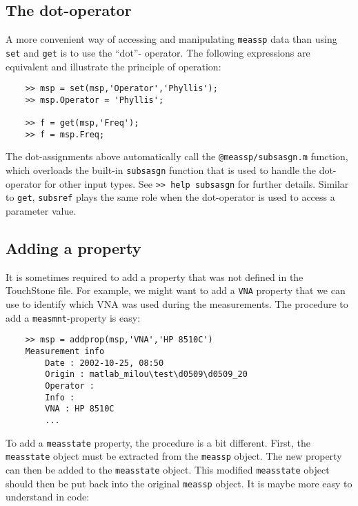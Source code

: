 \subsection{The dot-operator}
A more convenient way of accessing and manipulating \verb"meassp"
data than using \verb"set" and \verb"get" is to use the ``dot''-
operator. The following expressions are equivalent and illustrate
the principle of operation:

\begin{small}
\begin{verbatim}
    >> msp = set(msp,'Operator','Phyllis');
    >> msp.Operator = 'Phyllis';

    >> f = get(msp,'Freq');
    >> f = msp.Freq;
\end{verbatim}
\end{small}

The dot-assignments above automatically call the
\verb"@meassp/subsasgn.m" function, which overloads the built-in
\verb"subsasgn" function that is used to handle the dot-operator
for other input types. See \verb">> help subsasgn" for further
details. Similar to \verb"get", \verb"subsref" plays the same role
when the dot-operator is used to access a parameter value.

\subsection{Adding a property}
It is sometimes required to add a property that was not defined in
the TouchStone file. For example, we might want to add a
\verb"VNA" property that we can use to identify which VNA was used
during the measurements. The procedure to add a
\verb"measmnt"-property is easy:

\begin{small}
\begin{verbatim}
    >> msp = addprop(msp,'VNA','HP 8510C')
    Measurement info
        Date : 2002-10-25, 08:50
        Origin : matlab_milou\test\d0509\d0509_20
        Operator :
        Info :
        VNA : HP 8510C
        ...
\end{verbatim}
\end{small}
To add a \verb"measstate" property, the procedure is a bit
different. First, the \verb"measstate" object must be extracted
from the \verb"meassp" object. The new property can then be added
to the \verb"measstate" object. This modified \verb"measstate"
object should then be put back into the original \verb"meassp"
object. It is maybe more easy to understand in code:

